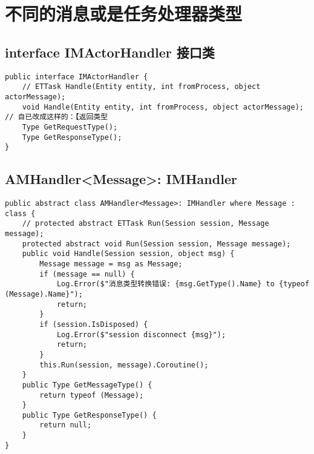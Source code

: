 \documentclass[9pt, b5paper]{article}
\begin{document}
\section{不同的消息或是任务处理器类型}
\label{sec-7}
\subsection{interface IMActorHandler 接口类}
\label{sec-7-1}
\begin{verbatim}
public interface IMActorHandler {
    // ETTask Handle(Entity entity, int fromProcess, object actorMessage); 
    void Handle(Entity entity, int fromProcess, object actorMessage); // 自已改成这样的：【返回类型
    Type GetRequestType();
    Type GetResponseType();
}
\end{verbatim}
\subsection{AMHandler<Message>: IMHandler}
\label{sec-7-2}
\begin{verbatim}
public abstract class AMHandler<Message>: IMHandler where Message : class {
    // protected abstract ETTask Run(Session session, Message message);
    protected abstract void Run(Session session, Message message);
    public void Handle(Session session, object msg) {
        Message message = msg as Message;
        if (message == null) {
            Log.Error($"消息类型转换错误: {msg.GetType().Name} to {typeof (Message).Name}");
            return;
        }
        if (session.IsDisposed) {
            Log.Error($"session disconnect {msg}");
            return;
        }
        this.Run(session, message).Coroutine();
    }
    public Type GetMessageType() {
        return typeof (Message);
    }
    public Type GetResponseType() {
        return null;
    }
}
\end{verbatim}
\end{document}
